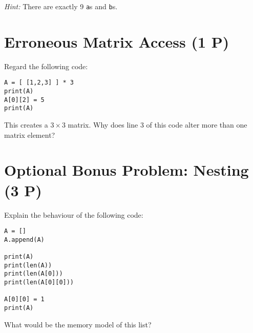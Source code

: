\documentclass[
	ngerman,
	fontsize=10pt,
	parskip=half,
	titlepage=true,
	DIV=12
]{scrartcl}
\begin{document}
\emph{Hint:} There are exactly 9 \texttt{a}s and \texttt{b}s.


\section{Erroneous Matrix Access (1 P)}
Regard the following code:

\begin{verbatim}
A = [ [1,2,3] ] * 3
print(A)
A[0][2] = 5
print(A)
\end{verbatim}

This creates a $3 \times 3$ matrix. Why does line 3 of this code alter more than one matrix element?


\section*{Optional Bonus Problem: Nesting (3 P)}
Explain the behaviour of the following code:

\begin{verbatim}
A = []
A.append(A)

print(A)
print(len(A))
print(len(A[0]))
print(len(A[0][0]))

A[0][0] = 1
print(A)
\end{verbatim}

What would be the memory model of this list?
\end{document}
